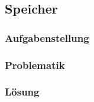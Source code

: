 \subsection{Speicher}

\subsubsection*{Aufgabenstellung}

\subsubsection*{Problematik}

\subsubsection*{Lösung}
